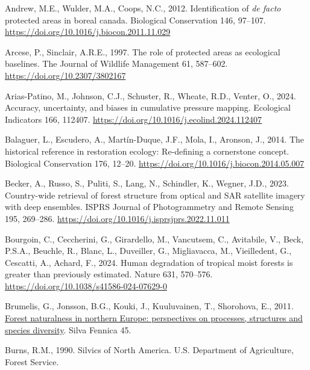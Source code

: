 \documentclass[
]{agujournal2019}
\newlength{\cslhangindent}
\newenvironment{CSLReferences}[2] %
 {\begin{list}{}{%
  \setlength{\itemindent}{0pt}
  \setlength{\leftmargin}{0pt}
  \setlength{\parsep}{0pt}
  \ifodd #1
   \setlength{\leftmargin}{\cslhangindent}
   \setlength{\itemindent}{-1\cslhangindent}
  \fi
  \setlength{\itemsep}{#2\baselineskip}}}
 {\end{list}}
\begin{document}
\label{refs}
\begin{CSLReferences}{1}{0}
\vspace{1em}

Andrew, M.E., Wulder, M.A., Coops, N.C., 2012. Identification of
{\emph{de facto}} protected areas in boreal canada. Biological
Conservation 146, 97--107.
\url{https://doi.org/10.1016/j.biocon.2011.11.029}

Arcese, P., Sinclair, A.R.E., 1997. The role of protected areas as
ecological baselines. The Journal of Wildlife Management 61, 587--602.
\url{https://doi.org/10.2307/3802167}

Arias-Patino, M., Johnson, C.J., Schuster, R., Wheate, R.D., Venter, O.,
2024. Accuracy, uncertainty, and biases in cumulative pressure mapping.
Ecological Indicators 166, 112407.
\url{https://doi.org/10.1016/j.ecolind.2024.112407}

Balaguer, L., Escudero, A., Martín-Duque, J.F., Mola, I., Aronson, J.,
2014. The historical reference in restoration ecology: Re-defining a
cornerstone concept. Biological Conservation 176, 12--20.
\url{https://doi.org/10.1016/j.biocon.2014.05.007}

Becker, A., Russo, S., Puliti, S., Lang, N., Schindler, K., Wegner,
J.D., 2023. Country-wide retrieval of forest structure from optical and
SAR satellite imagery with deep ensembles. ISPRS Journal of
Photogrammetry and Remote Sensing 195, 269--286.
\url{https://doi.org/10.1016/j.isprsjprs.2022.11.011}

Bourgoin, C., Ceccherini, G., Girardello, M., Vancutsem, C., Avitabile,
V., Beck, P.S.A., Beuchle, R., Blanc, L., Duveiller, G., Migliavacca,
M., Vieilledent, G., Cescatti, A., Achard, F., 2024. Human degradation
of tropical moist forests is greater than previously estimated. Nature
631, 570--576. \url{https://doi.org/10.1038/s41586-024-07629-0}

Brumelis, G., Jonsson, B.G., Kouki, J., Kuuluvainen, T., Shorohova, E.,
2011. \href{https://www.silvafennica.fi/article/446}{Forest naturalness
in northern Europe: perspectives on processes, structures and species
diversity}. Silva Fennica 45.

Burns, R.M., 1990. Silvics of North America. U.S. Department of
Agriculture, Forest Service.


\end{CSLReferences}
\end{document}

